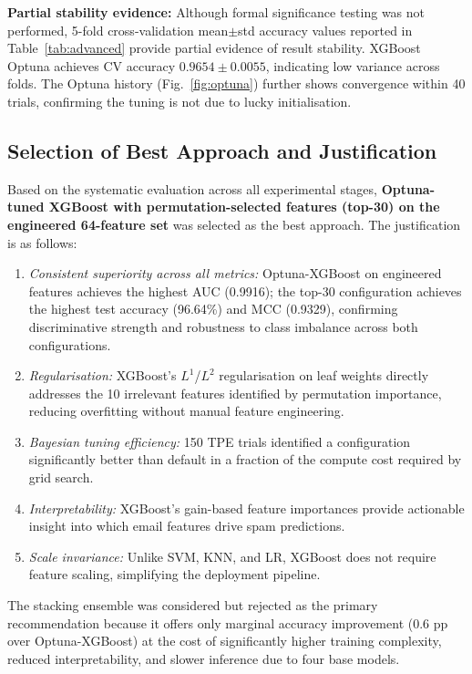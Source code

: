 \documentclass[conference]{IEEEtran}
\begin{document}
\textbf{Partial stability evidence:} Although formal significance testing was not performed, 5-fold cross-validation mean$\pm$std accuracy values reported in Table~\ref{tab:advanced} provide partial evidence of result stability. XGBoost Optuna achieves CV accuracy $0.9654\pm0.0055$, indicating low variance across folds. The Optuna history (Fig.~\ref{fig:optuna}) further shows convergence within 40 trials, confirming the tuning is not due to lucky initialisation.

\subsection{Selection of Best Approach and Justification}

Based on the systematic evaluation across all experimental stages, \textbf{Optuna-tuned XGBoost with permutation-selected features (top-30) on the engineered 64-feature set} was selected as the best approach. The justification is as follows:

\begin{enumerate}
    \item \textit{Consistent superiority across all metrics:} Optuna-XGBoost on engineered features achieves the highest AUC (0.9916); the top-30 configuration achieves the highest test accuracy (96.64\%) and MCC (0.9329), confirming discriminative strength and robustness to class imbalance across both configurations.
    \item \textit{Regularisation:} XGBoost's $L^1$/$L^2$ regularisation on leaf weights directly addresses the 10 irrelevant features identified by permutation importance, reducing overfitting without manual feature engineering.
    \item \textit{Bayesian tuning efficiency:} 150 TPE trials identified a configuration significantly better than default in a fraction of the compute cost required by grid search.
    \item \textit{Interpretability:} XGBoost's gain-based feature importances provide actionable insight into which email features drive spam predictions.
    \item \textit{Scale invariance:} Unlike SVM, KNN, and LR, XGBoost does not require feature scaling, simplifying the deployment pipeline.
\end{enumerate}

The stacking ensemble was considered but rejected as the primary recommendation because it offers only marginal accuracy improvement (0.6 pp over Optuna-XGBoost) at the cost of significantly higher training complexity, reduced interpretability, and slower inference due to four base models.
\end{document}
